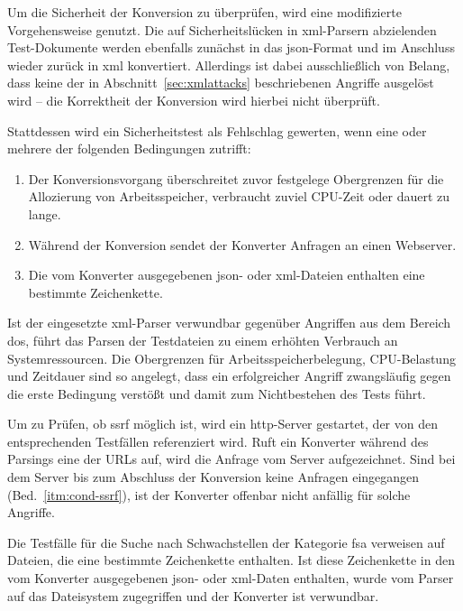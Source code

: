 Um die Sicherheit der Konversion zu überprüfen, wird eine modifizierte Vorgehensweise genutzt. Die auf Sicherheitslücken in \acrshort{xml}-Parsern abzielenden Test-Dokumente werden ebenfalls zunächst in das \acrshort{json}-Format und im Anschluss wieder zurück in \acrshort{xml} konvertiert. Allerdings ist dabei ausschließlich von Belang, dass keine der in Abschnitt~\ref{sec:xmlattacks} beschriebenen Angriffe ausgelöst wird -- die Korrektheit der Konversion wird hierbei nicht überprüft.

Stattdessen wird ein Sicherheitstest als Fehlschlag gewerten, wenn eine oder mehrere der folgenden Bedingungen zutrifft:
\begin{enumerate}
    \item{} Der Konversionsvorgang überschreitet zuvor festgelege Obergrenzen für die Allozierung von Arbeitsspeicher, verbraucht zuviel CPU-Zeit oder dauert zu lange.\label{itm:cond-dos}
    \item{} Während der Konversion sendet der Konverter Anfragen an einen Webserver.\label{itm:cond-ssrf}
    \item{} Die vom Konverter ausgegebenen \acrshort{json}- oder \acrshort{xml}-Dateien enthalten eine bestimmte Zeichenkette.\label{itm:cond-fsa}
\end{enumerate}

Ist der eingesetzte \acrshort{xml}-Parser verwundbar gegenüber Angriffen aus dem Bereich \acrfull{dos}, führt das Parsen der Testdateien zu einem erhöhten Verbrauch an Systemressourcen. Die Obergrenzen für Arbeitsspeicherbelegung, CPU-Belastung und Zeitdauer sind so angelegt, dass ein erfolgreicher Angriff zwangsläufig gegen die erste Bedingung verstößt und damit zum Nichtbestehen des Tests führt.

Um zu Prüfen, ob \acrfull{ssrf} möglich ist, wird ein \acrshort{http}-Server gestartet, der von den entsprechenden Testfällen referenziert wird. Ruft ein Konverter während des Parsings eine der URLs auf, wird die Anfrage vom Server aufgezeichnet. Sind bei dem Server bis zum Abschluss der Konversion keine Anfragen eingegangen (Bed.~\ref{itm:cond-ssrf}), ist der Konverter offenbar nicht anfällig für solche Angriffe.

Die Testfälle für die Suche nach Schwachstellen der Kategorie \acrlong{fsa} verweisen auf Dateien, die eine bestimmte Zeichenkette enthalten. Ist diese Zeichenkette in den vom Konverter ausgegebenen \acrshort{json}- oder \acrshort{xml}-Daten enthalten, wurde vom Parser auf das Dateisystem zugegriffen und der Konverter ist verwundbar.

